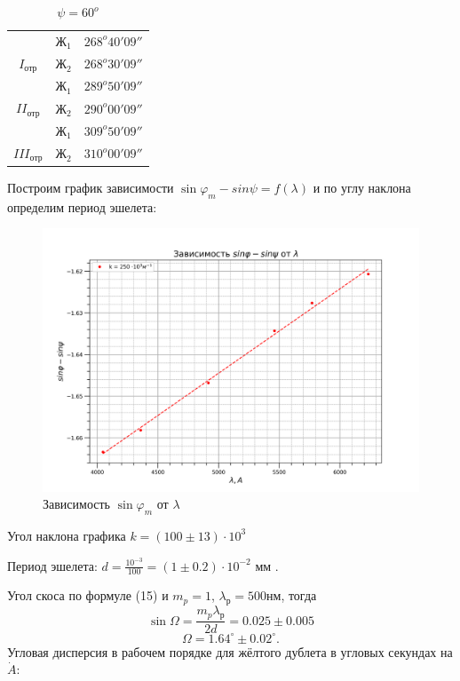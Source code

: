 \documentclass[a4paper, 12pt]{article}%
\begin{document}
\begin{table}[H]	
	\begin{center}
		\begin{tabular}{|c|c|c|} \hline
			& $Ж_1$ & $268^o40'09''$\\
			\cline{2-3}
			$I_{отр}$
			& $Ж_2$ & $268^o30'09''$ \\\hline
			& $Ж_1$ & $289^o50'09''$ \\
			\cline{2-3}
			$II_{отр}$
			& $Ж_2$ & $290^o00'09''$ \\\hline
			& $Ж_1$ & $309^o50'09''$\\
			\cline{2-3}
			$III_{отр}$
			& $Ж_2$ & $310^o00'09''$ \\\hline
		\end{tabular}
		\caption{$\psi = 60^o$}
	\end{center}
\end{table}


Построим график зависимости $\sin \varphi_m - sin \psi= f(\lambda)$ и по углу наклона определим период эшелета:
\begin{figure}[H]
	\includegraphics[width = 1.0\linewidth]{sin.png}
	\caption{Зависимость $\sin \varphi_m$ от $\lambda$}
\end{figure}
Угол наклона графика $k = (100 \pm 13)\cdot 10^3$

Период эшелета: $d = \frac{10^{-3}}{100} = (1 \pm 0.2) \cdot 10^{-2}$ мм .

Угол скоса по формуле (15) и $ m_{p} = 1 $, $ \lambda_{р} = 500 $нм, тогда
\begin{equation*}\label{key}
	\sin \Omega = \frac{m_{p} \lambda_{р}}{2 d} = 0.025\pm 0.005
\end{equation*}
\begin{equation*}\label{key}
	\Omega = 1.64^\circ \pm 0.02^\circ.
\end{equation*} 
Угловая дисперсия в рабочем порядке для жёлтого дублета в угловых секундах на $\dot A$:
\end{document}
